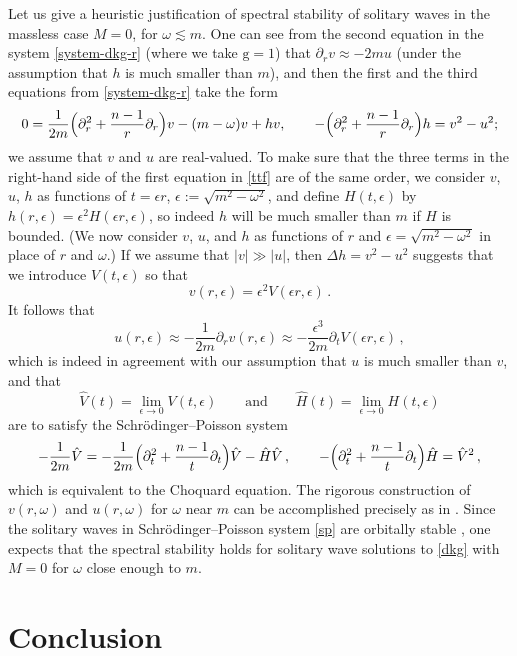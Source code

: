 \documentclass[12pt]{extarticle}
\newcommand{\coupling}{\mathrm{g}}
\newcommand{\p}{\partial}
\newcommand{\abs}[1]{\vert #1 \vert}
\theoremstyle{plain}
\theoremstyle{remark}
\begin{document}
Let us give a heuristic justification of
spectral stability of solitary waves
in the massless case $M=0$,
for $\omega\lesssim m$.
One can see from the second equation
in the system
\eqref{system-dkg-r}
(where we take $\coupling=1$)
that $\p_r v\approx -2m u$
(under the assumption that $h$ is much smaller
than $m$),
and then the first and the third
equations
from \eqref{system-dkg-r}
take the form
\begin{equation}\label{ttf}
    0=\frac{1}{2m}
\Bigl(\p_r^2+\frac{n-1}{r}\p_r\Bigr)
v
    -(m-\omega)v+hv,
    \qquad
-\Bigl(\p_r^2+\frac{n-1}{r}\p_r\Bigr)h
=v^2-u^2;
\end{equation}
we assume that $v$ and $u$ are real-valued.
To make sure that
the three terms in the right-hand
side of
the first equation
in \eqref{ttf}
are of the same order,
we consider $v$, $u$, $h$
as functions of $t=\epsilon r$,
$\epsilon:=\sqrt{m^2-\omega^2}$,
and define $H(t,\epsilon)$ by
$h(r,\epsilon)=\epsilon^2 H(\epsilon r,\epsilon)$,
so indeed $h$ will be much smaller
than $m$ if $H$ is bounded.
(We now consider
$v$, $u$, and $h$
as functions of $r$ and
$\epsilon=\sqrt{m^2-\omega^2}$
in place of $r$ and $\omega$.)
If we assume that
$\abs{v}\gg\abs{u}$,
then $\Delta h=v^2-u^2$
suggests that we introduce
$V(t,\epsilon)$
so that
\[
v(r,\epsilon)=\epsilon^2 V(\epsilon r,\epsilon)\,.
\]
It follows that
\[  
u(r,\epsilon)
\approx -\frac{1}{2m}\p_r v(r,\epsilon)
\approx
-\frac{\epsilon^3}{2m}
\p_t V(\epsilon r,\epsilon)\,,
\]
which is
indeed in agreement with our
assumption that
$u$ is much smaller than $v$,
and that
\[
\hat V(t)=\lim_{\epsilon\to 0}V(t,\epsilon)
\qquad \text{and} \qquad
\hat H(t)=\lim_{\epsilon\to 0}H(t,\epsilon)
\]
are to satisfy
the Schr\"odinger--Poisson system
\begin{equation}\label{sp}
-\frac{1}{2m}\hat V
=-\frac{1}{2m}
\Bigl(
\p_t^2+\frac{n-1}{t}\p_t\Bigr)
\hat V
-\hat H \hat V\,,
\qquad
-\Bigl(
\p_t^2+\frac{n-1}{t}\p_t\Bigr)
\hat H=\hat V^2\,,
\end{equation}
which is equivalent to the Choquard equation.
The rigorous construction of
$v(r,\omega)$ and $u(r,\omega)$
for $\omega$ near $m$ can be accomplished
precisely as in \cite{comech2018small}.
Since the solitary waves in
Schr\"odinger--Poisson system
\eqref{sp}
are orbitally stable
\cite{cazenave1982orbital},
one expects
that the spectral stability holds
for solitary wave solutions to
\eqref{dkg} with $M=0$ for $\omega$ close enough to $m$.

\section{Conclusion}
\end{document}
